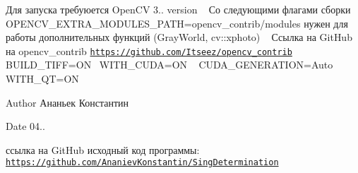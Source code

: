 Для запуска требуюется Open\+C\+V 3.. version ~\newline
 Со следующими флагами сборки ~\newline
 O\+P\+E\+N\+C\+V\+\_\+\+E\+X\+T\+R\+A\+\_\+\+M\+O\+D\+U\+L\+E\+S\+\_\+\+P\+A\+T\+H=opencv\+\_\+contrib/modules нужен для работы дополнительных функций (Gray\+World, cv\+::xphoto) ~\newline
 Ссылка на Git\+Hub на opencv\+\_\+contrib \href{https://github.com/Itseez/opencv_contrib}{\tt https\+://github.\+com/\+Itseez/opencv\+\_\+contrib} ~\newline
 B\+U\+I\+L\+D\+\_\+\+T\+I\+F\+F=O\+N~\newline
 W\+I\+T\+H\+\_\+\+C\+U\+D\+A=O\+N ~\newline
 C\+U\+D\+A\+\_\+\+G\+E\+N\+E\+R\+A\+T\+I\+O\+N=Auto ~\newline
 W\+I\+T\+H\+\_\+\+Q\+T=O\+N ~\newline
 \begin{DoxyAuthor}{Author}
Ананьек Константин
\end{DoxyAuthor}
\begin{DoxyDate}{Date}
04..
\end{DoxyDate}
ссылка на Git\+Hub исходный код программы\+: ~\newline
 \href{https://github.com/AnanievKonstantin/SingDetermination}{\tt https\+://github.\+com/\+Ananiev\+Konstantin/\+Sing\+Determination} 